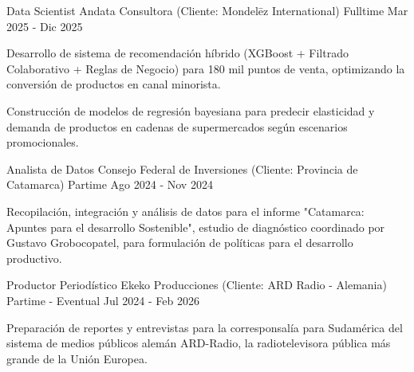 

\begin{cventries}


  \cventry%
    {Data Scientist}%
    {Andata Consultora (Cliente: Mondelēz International)}%
    {Fulltime}%
    {Mar 2025 - Dic 2025}%
    {%
      \begin{cvitems}
        \item {Desarrollo de sistema de recomendación híbrido (XGBoost + Filtrado Colaborativo + Reglas de Negocio) para 180 mil puntos de venta, optimizando la conversión de productos en canal minorista.}
        \item {Construcción de modelos de regresión bayesiana para predecir elasticidad y demanda de productos en cadenas de supermercados según escenarios promocionales.}
      \end{cvitems}%
    }


  \cventry%
    {Analista de Datos}%
    {Consejo Federal de Inversiones (Cliente: Provincia de Catamarca)}%
    {Partime}%
    {Ago 2024 - Nov 2024}%
    {%
      \begin{cvitems}
        \item {Recopilación, integración y análisis de datos para el informe "Catamarca: Apuntes para el desarrollo Sostenible",  estudio de diagnóstico coordinado por Gustavo Grobocopatel, para formulación de políticas para el desarrollo productivo.}
      \end{cvitems}%
    }

\cventry%
    {Productor Periodístico}%
    {Ekeko Producciones (Cliente: ARD Radio - Alemania)}%
    {Partime - Eventual}%
    {Jul 2024 - Feb 2026}%
    {%
      \begin{cvitems}
        \item {Preparación de reportes y entrevistas para la corresponsalía para Sudamérica del sistema de medios públicos alemán ARD-Radio, la radiotelevisora pública más grande de la Unión Europea.}
      \end{cvitems}%
    }
    

\end{cventries}
